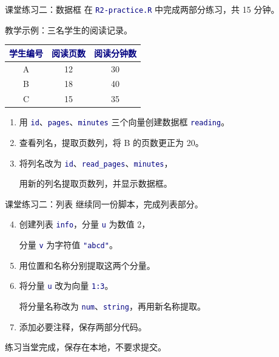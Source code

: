 \documentclass[14pt,compress,t,noamsthm,notheorem,table,handout,fontset=none]{ctexbeamer}
\newcommand{\code}[1]{\textcolor{navy}{\texttt{#1}}}
\newcommand{\thead}[1]{\textcolor{navy}{\textbf{#1}}}
\begin{document}
\begin{frame}{课堂练习二：数据框}
  \small
  在 \code{R2-practice.R} 中完成两部分练习，共 15 分钟。\par
  教学示例：三名学生的阅读记录。
  \par\vspace{0.3em}
  \renewcommand{\arraystretch}{1.2}
  \begin{tabular*}{\linewidth}{@{\extracolsep{\fill}}ccc@{}}
    \toprule
    \thead{学生编号} & \thead{阅读页数} & \thead{阅读分钟数} \\
    \midrule
    A & 12 & 30 \\
    B & 18 & 40 \\
    C & 15 & 35 \\
    \bottomrule
  \end{tabular*}\par
  \begin{enumerate}
    \item 用 \code{id}、\code{pages}、\code{minutes} 三个向量创建数据框 \code{reading}。
    \item 查看列名，提取页数列，将 B 的页数更正为 20。
    \item 将列名改为 \code{id}、\code{read\_pages}、\code{minutes}，\par
      用新的列名提取页数列，并显示数据框。
  \end{enumerate}
\end{frame}

\begin{frame}{课堂练习二：列表}
  \small
  继续同一份脚本，完成列表部分。
  \begin{enumerate}
    \setcounter{enumi}{3}
    \item 创建列表 \code{info}，分量 \code{u} 为数值 2，\par
      分量 \code{v} 为字符值 \code{"abcd"}。
    \item 用位置和名称分别提取这两个分量。
    \item 将分量 \code{u} 改为向量 \code{1:3}。\par
      将分量名称改为 \code{num}、\code{string}，再用新名称提取。
    \item 添加必要注释，保存两部分代码。
  \end{enumerate}
  \vfill
  练习当堂完成，保存在本地，不要求提交。
\end{frame}
\end{document}
